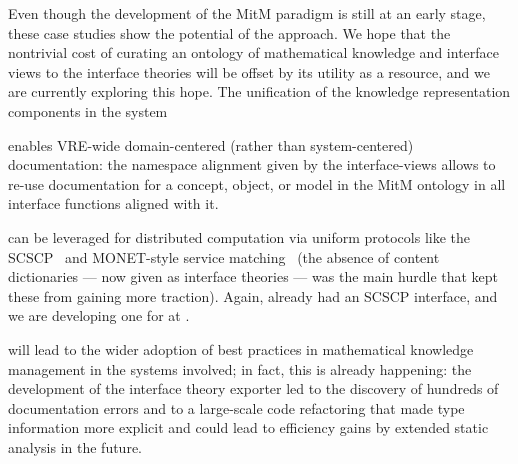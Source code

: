 Even though the development of the MitM paradigm is still at an early stage, these case
studies show the potential of the approach. We hope that the nontrivial cost of curating
an ontology of mathematical knowledge and interface views to the interface theories will
be offset by its utility as a resource, and we are currently exploring this hope.
The unification of the knowledge representation components in the \MMT system
\begin{compactenum}
\item enables VRE-wide domain-centered (rather than system-centered) documentation: the
  namespace alignment given by the interface-views allows to re-use documentation for a
  concept, object, or model in the MitM ontology in all interface functions aligned with
  it.
\item can be leveraged for distributed computation via uniform protocols like the
  SCSCP~\cite{HorRoz:ossp09} and MONET-style service
  matching~\cite{CaprottiEtAl:MathServiceMatching04:tr} (the absence of content
  dictionaries --- now given as interface theories --- was the main hurdle that kept these
  from gaining more traction). Again, \GAP already had an SCSCP interface, and we are
  developing one for \SageMath at \cite{py-scscp:on}.
\item will lead to the wider adoption of best practices in mathematical knowledge
  management in the systems involved; in fact, this is already happening: the development
  of the \GAP interface theory exporter led to the discovery of hundreds of documentation
  errors and to a large-scale code refactoring that made type information more explicit
  and could lead to efficiency gains by extended static analysis in the future.
\end{compactenum}


